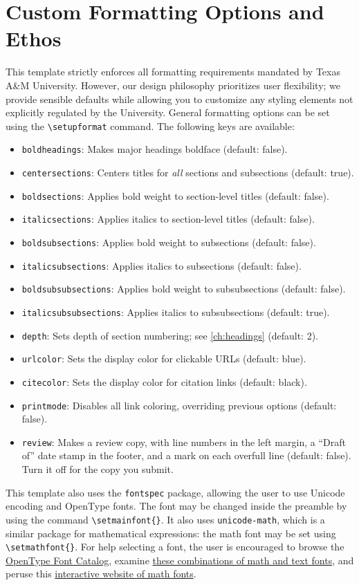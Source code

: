 \section{Custom Formatting Options and Ethos}\label{sec:customize}
This template strictly enforces all formatting requirements mandated by Texas A\&M University.
However, our design philosophy prioritizes user flexibility; we provide sensible defaults while allowing you to customize any styling elements not explicitly regulated by the University.
General formatting options can be set using the \verb|\setupformat| command.
The following keys are available:
\begin{itemize}
  \item \texttt{boldheadings}: Makes major headings boldface (default: false).
  \item \texttt{centersections}: Centers titles for \textit{all} sections and subsections (default: true).
  \item \texttt{boldsections}: Applies bold weight to section-level titles (default: false).
  \item \texttt{italicsections}: Applies italics to section-level titles (default: false).
  \item \texttt{boldsubsections}: Applies bold weight to subsections (default: false).
  \item \texttt{italicsubsections}: Applies italics to subsections (default: false).
  \item \texttt{boldsubsubsections}: Applies bold weight to subsubsections (default: false).
  \item \texttt{italicsubsubsections}: Applies italics to subsubsections (default: true).
  \item \texttt{depth}: Sets depth of section numbering; see \autoref{ch:headings} (default: 2).
  \item \texttt{urlcolor}: Sets the display color for clickable URLs (default: blue).
  \item \texttt{citecolor}: Sets the display color for citation links (default: black).
  \item \texttt{printmode}: Disables all link coloring, overriding previous options (default: false).
  \item \texttt{review}: Makes a review copy, with line numbers in the left margin, a ``Draft of'' date stamp in the footer, and a mark on each overfull line (default: false).
  Turn it off for the copy you submit.
\end{itemize}
This template also uses the \texttt{fontspec} package, allowing the user to use Unicode encoding and OpenType fonts.
The font may be changed inside the preamble by using the command \verb|\setmainfont{}|.
It also uses \texttt{unicode-math}, which is a similar package for mathematical expressions: the math font may be set using \verb|\setmathfont{}|.
For help selecting a font, the user is encouraged to browse the
\href{https://www.tug.org/FontCatalogue/opentypefonts.html}{OpenType Font Catalog}, examine
\href{https://tex.stackexchange.com/a/425099/433960}{these combinations of math and text fonts}, and peruse this
\href{https://fred-wang.github.io/MathFonts/}{interactive website of math fonts}.

